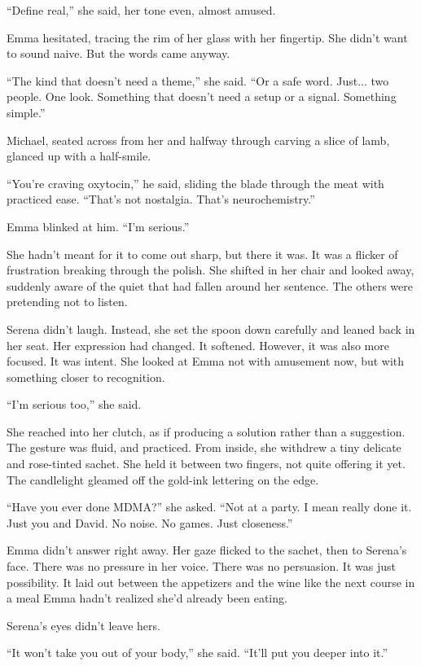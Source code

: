 ``Define real,'' she said, her tone even, almost amused.

Emma hesitated, tracing the rim of her glass with her fingertip. She didn’t want to sound naive. But 
the words came anyway.

``The kind that doesn’t need a theme,'' she said. ``Or a safe word. Just... two people. One look. 
Something that doesn't need a setup or a signal. Something simple.''

Michael, seated across from her and halfway through carving a slice of lamb, glanced up with a half-smile.

``You’re craving oxytocin,'' he said, sliding the blade through the meat with practiced ease. ``That’s not 
nostalgia. That’s neurochemistry.''

Emma blinked at him. ``I’m serious.''

She hadn’t meant for it to come out sharp, but there it was. It was a flicker of frustration breaking through 
the polish. She shifted in her chair and looked away, suddenly aware of the quiet that had fallen around her 
sentence. The others were pretending not to listen.

Serena didn’t laugh. Instead, she set the spoon down carefully and leaned back in her seat. Her expression had 
changed. It softened. However, it was also more focused. It was intent. She looked at Emma not with amusement now, 
but with something closer to recognition.

``I’m serious too,'' she said.

She reached into her clutch, as if producing a solution rather than a suggestion. The gesture was fluid, and  
practiced. From inside, she withdrew a tiny delicate and rose-tinted sachet. She held it between two fingers, 
not quite offering it yet. The candlelight gleamed off the gold-ink lettering on the edge.

``Have you ever done MDMA?'' she asked. ``Not at a party. I mean really done it. Just you and David. No noise. 
No games. Just closeness.''

Emma didn’t answer right away. Her gaze flicked to the sachet, then to Serena’s face. There was no pressure in 
her voice. There was no persuasion. It was just possibility. It laid out between the appetizers and the wine 
like the next course in a meal Emma hadn’t realized she’d already been eating.

Serena’s eyes didn’t leave hers.

``It won’t take you out of your body,'' she said. ``It’ll put you deeper into it.''

